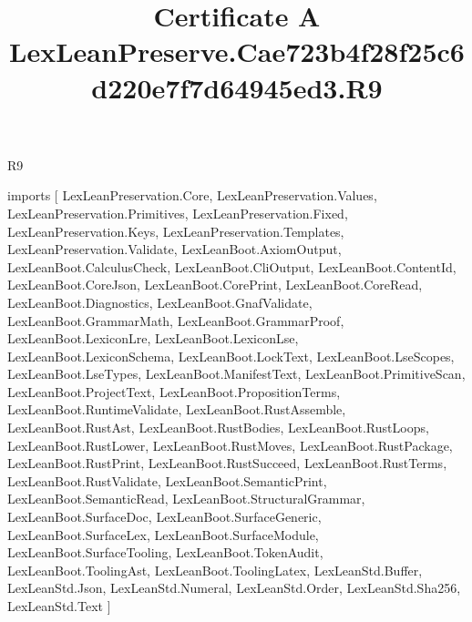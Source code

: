 \begin{lexlean}{R9}
\title{Certificate A LexLeanPreserve.Cae723b4f28f25c6d220e7f7d64945ed3.R9}
\begin{coremodule}
imports [
  LexLeanPreservation.Core,
  LexLeanPreservation.Values,
  LexLeanPreservation.Primitives,
  LexLeanPreservation.Fixed,
  LexLeanPreservation.Keys,
  LexLeanPreservation.Templates,
  LexLeanPreservation.Validate,
  LexLeanBoot.AxiomOutput,
  LexLeanBoot.CalculusCheck,
  LexLeanBoot.CliOutput,
  LexLeanBoot.ContentId,
  LexLeanBoot.CoreJson,
  LexLeanBoot.CorePrint,
  LexLeanBoot.CoreRead,
  LexLeanBoot.Diagnostics,
  LexLeanBoot.GnafValidate,
  LexLeanBoot.GrammarMath,
  LexLeanBoot.GrammarProof,
  LexLeanBoot.LexiconLre,
  LexLeanBoot.LexiconLse,
  LexLeanBoot.LexiconSchema,
  LexLeanBoot.LockText,
  LexLeanBoot.LseScopes,
  LexLeanBoot.LseTypes,
  LexLeanBoot.ManifestText,
  LexLeanBoot.PrimitiveScan,
  LexLeanBoot.ProjectText,
  LexLeanBoot.PropositionTerms,
  LexLeanBoot.RuntimeValidate,
  LexLeanBoot.RustAssemble,
  LexLeanBoot.RustAst,
  LexLeanBoot.RustBodies,
  LexLeanBoot.RustLoops,
  LexLeanBoot.RustLower,
  LexLeanBoot.RustMoves,
  LexLeanBoot.RustPackage,
  LexLeanBoot.RustPrint,
  LexLeanBoot.RustSucceed,
  LexLeanBoot.RustTerms,
  LexLeanBoot.RustValidate,
  LexLeanBoot.SemanticPrint,
  LexLeanBoot.SemanticRead,
  LexLeanBoot.StructuralGrammar,
  LexLeanBoot.SurfaceDoc,
  LexLeanBoot.SurfaceGeneric,
  LexLeanBoot.SurfaceLex,
  LexLeanBoot.SurfaceModule,
  LexLeanBoot.SurfaceTooling,
  LexLeanBoot.TokenAudit,
  LexLeanBoot.ToolingAst,
  LexLeanBoot.ToolingLatex,
  LexLeanStd.Buffer,
  LexLeanStd.Json,
  LexLeanStd.Numeral,
  LexLeanStd.Order,
  LexLeanStd.Sha256,
  LexLeanStd.Text
]


\end{coremodule}
\end{lexlean}
